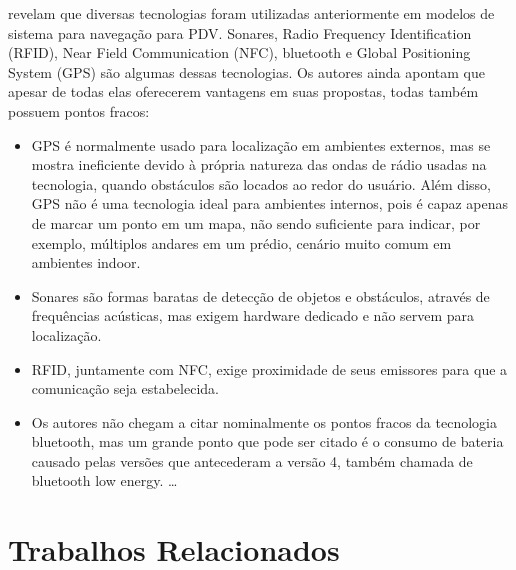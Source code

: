 \documentclass[english,brazilian]{UNISINOSmonografia}
\begin{document}
 revelam que diversas tecnologias foram utilizadas anteriormente em modelos de sistema para navegação para PDV. Sonares, Radio Frequency Identification (RFID), Near Field Communication (NFC), bluetooth e Global Positioning System (GPS) são algumas dessas tecnologias. Os autores ainda apontam que apesar de todas elas oferecerem vantagens em suas propostas, todas também possuem pontos fracos:

\begin{itemize}
  \item GPS é normalmente usado para localização em ambientes externos, mas se mostra ineficiente devido à própria natureza das ondas de rádio usadas na tecnologia, quando obstáculos são locados ao redor do usuário. Além disso, GPS não é uma tecnologia ideal para ambientes internos, pois é capaz apenas de marcar um ponto em um mapa, não sendo suficiente para indicar, por exemplo, múltiplos andares em um prédio, cenário muito comum em ambientes indoor. 
  \item Sonares são formas baratas de detecção de objetos e obstáculos, através de frequências acústicas, mas exigem hardware dedicado e não servem para localização.
  \item RFID, juntamente com NFC, exige proximidade de seus emissores para que a comunicação seja estabelecida.
  \item Os autores não chegam a citar nominalmente os pontos fracos da tecnologia bluetooth, mas um grande ponto que pode ser citado é o consumo de bateria causado pelas versões que antecederam a versão 4, também chamada de bluetooth low energy.    \ldots
\end{itemize}

\chapter{Trabalhos Relacionados}

\end{document}
